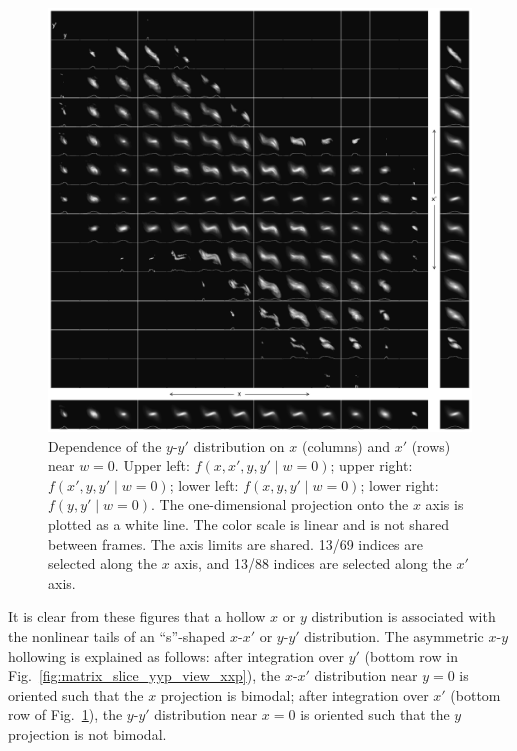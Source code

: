 \documentclass[%
 reprint,
 amsmath,amssymb,
 aps,
prstab,
]{revtex4-2}
\begin{document}
\begin{figure}[]
    \centering
    \includegraphics[width=\textwidth]{fig_matrix_slice_x-x'_view_y-y'.pdf}
    \caption{Dependence of the $y$-$y'$ distribution on $x$ (columns) and $x'$ (rows) near $w = 0$. Upper left: $f(x, x', y, y' \mid w{=}0)$; upper right: $f(x', y, y' \mid w{=}0)$; lower left: $f(x, y, y' \mid w{=}0)$; lower right: $f(y, y' \mid w{=}0)$. The one-dimensional projection onto the $x$ axis is plotted as a white line. The color scale is linear and is not shared between frames. The axis limits are shared. 13/69 indices are selected along the $x$ axis, and 13/88 indices are selected along the $x'$ axis.}
    \label{fig:matrix_slice_xxp_view_yyp}
\end{figure}
%
It is clear from these figures that a hollow $x$ or $y$ distribution is associated with the nonlinear tails of an ``s''-shaped $x$-$x'$ or $y$-$y'$ distribution. The asymmetric $x$-$y$ hollowing is explained as follows: after integration over $y'$ (bottom row in Fig.~\ref{fig:matrix_slice_yyp_view_xxp}), the $x$-$x'$ distribution near $y = 0$ is oriented such that the $x$ projection is bimodal; after integration over $x'$ (bottom row of Fig.~\ref{fig:matrix_slice_xxp_view_yyp}), the $y$-$y'$ distribution near $x = 0$ is oriented such that the $y$ projection is not bimodal.
\end{document}

